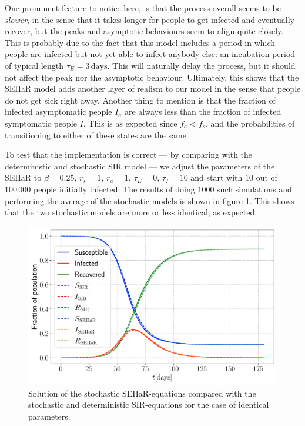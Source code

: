 One prominent feature to notice here, is that the process overall seems to be \textit{slower}, in the sense that it takes longer for people to get infected and eventually recover, but the peaks and asymptotic behaviours seem to align quite closely. This is probably due to the fact that this model includes a period in which people are infected but not yet able to infect anybody else: an incubation period of typical length $\tau_E = 3 \, \mathrm{days}$. This will naturally delay the process, but it should not affect the peak nor the asymptotic behaviour. Ultimately, this shows that the SEIIaR model adds another layer of realism to our model in the sense that people do not get sick right away. Another thing to mention is that the fraction of infected asymptomatic people $I_a$ are always less than the fraction of infected symptomatic people $I$. This is as expected since $f_a < f_s$, and the probabilities of transitioning to either of these states are the same.

To test that the implementation is correct --- by comparing with the deterministic and stochastic SIR model --- we adjust the parameters of the SEIIaR to $\beta = 0.25$, $r_s = 1$, $r_a = 1$, $\tau_E = 0$, $\tau_I= 10$ and start with $10$ out of $100 \, 000$ people initially infected. The results of doing $1000$ such simulations and performing the average of the stochastic models is shown in figure \ref{fig:comparison_SIR}. This shows that the two stochastic models are more or less identical, as expected.

\begin{figure}[htb]
	\centering
	\includegraphics[width=0.8\columnwidth]{../fig/test_comparison.pdf}
	\caption{Solution of the stochastic SEIIaR-equations compared with the stochastic and deterministic SIR-equations for the case of identical parameters.}
	\label{fig:comparison_SIR}
\end{figure}

